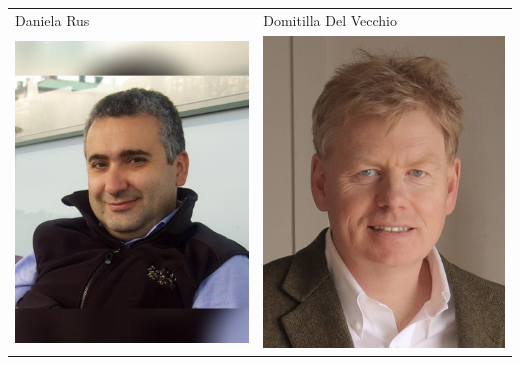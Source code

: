 \documentclass[landscape,a0paper,fontscale=0.292]{baposter}
\begin{document}
\begin{poster}
{\begin{center}
\begin{tabularx}{\linewidth}{X X}
{\tiny \centering Daniela Rus }& {\tiny \centering Domitilla Del Vecchio }\\ 
 {\centering \includegraphics[width=0.85\linewidth]{frazzoli.jpg}}&
{\centering \includegraphics[width=0.85\linewidth]{leonard.jpg}}\\ 


\end{tabularx}
\end{center}}
\end{poster}
\end{document}
